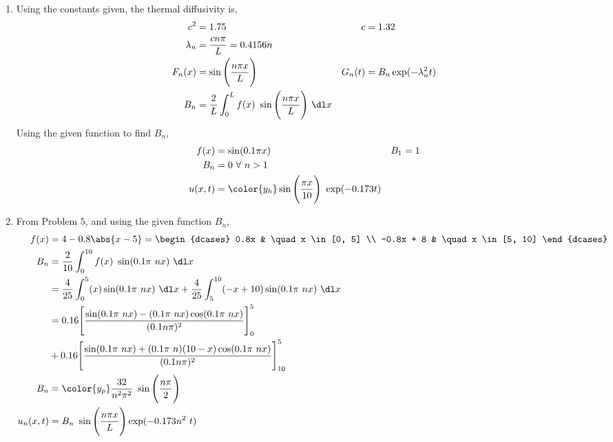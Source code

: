 \begin{enumerate}
    \item Using the constants given, the thermal diffusivity is,
          \begin{align}
              c^2       & = 1.75                                      &
              c         & = 1.32                                        \\
              \lambda_n & = \frac{c n\pi}{L} = 0.4156 n                 \\
              F_n(x)    & = \sin\Bigg( \frac{n\pi x}{L} \Bigg)        &
              G_n(t)    & = B_n \exp(-\lambda_n^2 t)                    \\
              B_n       & = \frac{2}{L} \int_{0}^{L} f(x)\ \sin\Bigg(
              \frac{n\pi x}{L} \Bigg)\ \dl x
          \end{align}
          Using the given function to find $ B_n $,
          \begin{align}
              f(x)    & = \sin(0.1 \pi x)                                  &
              B_1     & = 1                                                  \\
              B_n     & = 0\ \forall\ n > 1                                  \\
              u(x, t) & = \color{y_h} \sin\Bigg( \frac{\pi x}{10} \Bigg)\
              \exp(- 0.173 t)
          \end{align}

    \item From Problem $ 5 $, and using the given function $ B_n $,
          \begin{align}
              f(x)      & = 4 - 0.8 \abs{x-5} = \begin{dcases}
                                                    0.8x      & \quad x \in[0, 5]  \\
                                                    -0.8x + 8 & \quad x \in[5, 10]
                                                \end{dcases}       \\
              B_n       & = \frac{2}{10} \int_{0}^{10} f(x)\ \sin(0.1\pi\ nx)\ \dl x \\
                        & = \frac{4}{25}\int_{0}^{5} (x) \sin(0.1\pi\ nx)\ \dl x
              + \frac{4}{25}\int_{5}^{10} (-x + 10) \sin(0.1\pi\ nx)\ \dl x          \\
                        & = 0.16\Bigg[ \frac{\sin(0.1\pi\ nx) - (0.1\pi\ nx)
              \cos(0.1\pi\ nx)}{(0.1n\pi)^2} \Bigg]_0^5                              \\
                        & + 0.16\Bigg[ \frac{\sin(0.1\pi\ nx) + (0.1\pi\ n)(10-x)
              \cos(0.1\pi\ nx)}{(0.1n\pi)^2} \Bigg]_{10}^5                           \\
              B_n       & = \color{y_p}\frac{32}{n^2 \pi^2}\ \sin\Bigg(
              \frac{n\pi}{2} \Bigg)                                                  \\
              u_n(x, t) & = B_n\ \sin\Bigg( \frac{n\pi x}{L} \Bigg)
              \exp(-0.173n^2\ t)
          \end{align}


\end{enumerate}
